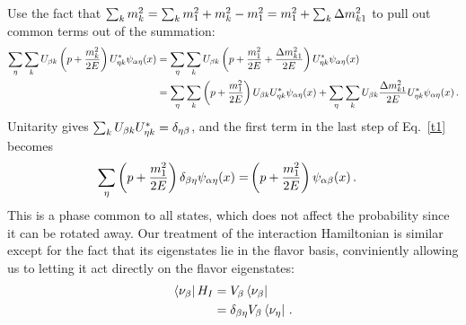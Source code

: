 \documentclass[draft=True]{revtex4-2}
\begin{document}
Use the fact that $\sum_k m_k^2 = \sum_k m_1^2 + m^2_k - m^2_1 = m_1^2 + \sum_k \dm_{k1}$ to pull out common terms out of the summation:
\begin{align}\label{eq:t1}
    \sum_\eta \sum_k U_{\b k} \left(p + \frac{m^2_k}{2E}\right) U^*_{\eta k} \psi_{\a\eta}(x) &= \sum_\eta \sum_k U_{\b k} \left(p + \frac{m^2_1}{2E} + \frac{\dm_{k1}}{2E}\right) U^*_{\eta k} \psi_{\a\eta}(x) \nonumber \\
    &= \sum_\eta\sum_k \left(p + \frac{m^2_1}{2E}\right) U_{\b k} U^*_{\eta k} \psi_{\a\eta}(x) + \sum_\eta\sum_k U_{\b k} \frac{\dm_{k1}}{2E} U^*_{\eta k} \psi_{\a\eta}(x)\,.
\end{align}
Unitarity gives $ \sum_k U_{\beta k} U^*_{\eta k} = \delta_{\eta\beta}$, and the first term in the last step of Eq.~\ref{t1} becomes
\begin{align}
    \sum_\eta \left(p + \frac{m^2_1}{2E}\right) \delta_{\beta \eta} \psi_{\alpha\eta}(x)
    =& \left(p + \frac{m^2_1}{2E}\right) \psi_{\alpha\beta}(x)\,.
\end{align}
This is a phase common to all states, which does not affect the probability since it can be rotated away.
Our treatment of the interaction Hamiltonian is similar except for the fact that its eigenstates lie in the flavor basis, conviniently allowing us
to letting it act directly on the flavor eigenstates:
\begin{align}
    \bra{\nu_{\beta}}H_I &= V_\beta \bra{\nu_{\beta}} \nonumber\\
                    &= \delta_{\beta\eta} V_\beta \bra{\nu_\eta}\,.
\end{align}  
%
%
\end{document}
